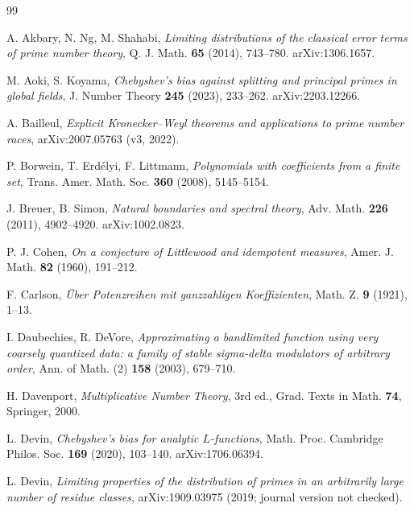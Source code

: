 \documentclass[11pt]{amsart}
\theoremstyle{definition}
\numberwithin{equation}{section}
\begin{document}
\medskip
\tableofcontents










\begin{thebibliography}{99}\small

 A. Akbary, N. Ng, M. Shahabi, \emph{Limiting distributions of the classical error terms of prime number theory}, Q. J. Math. \textbf{65} (2014), 743--780. arXiv:1306.1657.

 M. Aoki, S. Koyama, \emph{Chebyshev's bias against splitting and principal primes in global fields}, J. Number Theory \textbf{245} (2023), 233--262. arXiv:2203.12266.

 A. Bailleul, \emph{Explicit Kronecker--Weyl theorems and applications to prime number races}, arXiv:2007.05763 (v3, 2022).

 P. Borwein, T. Erd\'elyi, F. Littmann, \emph{Polynomials with coefficients from a finite set}, Trans. Amer. Math. Soc. \textbf{360} (2008), 5145--5154.

 J. Breuer, B. Simon, \emph{Natural boundaries and spectral theory}, Adv. Math. \textbf{226} (2011), 4902--4920. arXiv:1002.0823.

 P. J. Cohen, \emph{On a conjecture of Littlewood and idempotent measures}, Amer. J. Math. \textbf{82} (1960), 191--212.

 F. Carlson, \emph{\"Uber Potenzreihen mit ganzzahligen Koeffizienten}, Math. Z. \textbf{9} (1921), 1--13.

 I. Daubechies, R. DeVore, \emph{Approximating a bandlimited function using very coarsely quantized data: a family of stable sigma-delta modulators of arbitrary order}, Ann. of Math. (2) \textbf{158} (2003), 679--710.

 H. Davenport, \emph{Multiplicative Number Theory}, 3rd ed., Grad. Texts in Math. \textbf{74}, Springer, 2000.

 L. Devin, \emph{Chebyshev's bias for analytic $L$-functions}, Math. Proc. Cambridge Philos. Soc. \textbf{169} (2020), 103--140. arXiv:1706.06394.

 L. Devin, \emph{Limiting properties of the distribution of primes in an arbitrarily large number of residue classes}, arXiv:1909.03975 (2019; journal version not checked).


\end{thebibliography}
\end{document}
